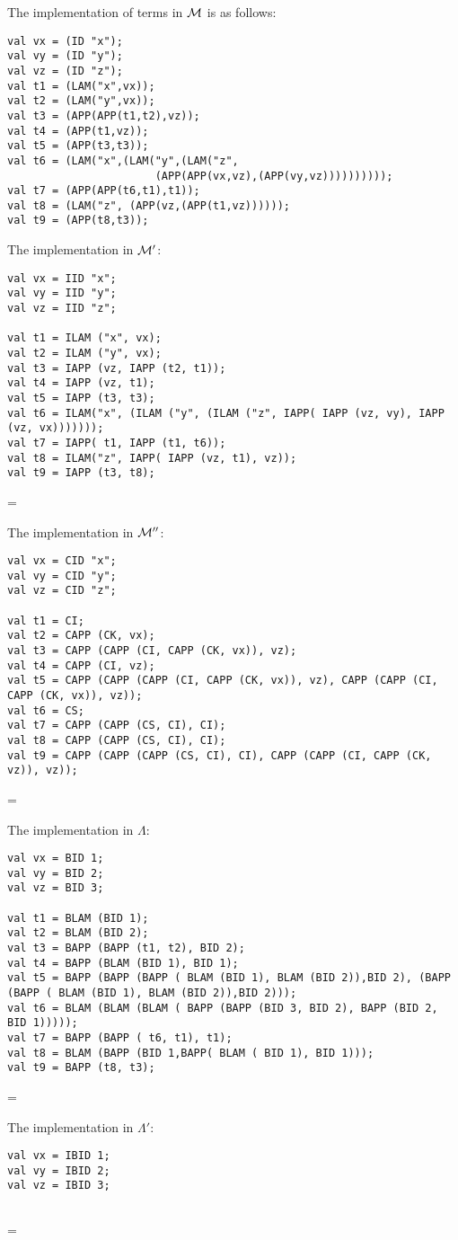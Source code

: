 \documentclass[11pt]{article}
\newenvironment{neverbreak} %
{\par\nobreak\vfil\penalty0\vfilneg
	\vtop\bgroup}
{\par\xdef\tpd{\the\prevdepth}\egroup
	\prevdepth=\tpd}
\begin{document}
\begin{enumerate}
\noindent
The implementation of terms in ${\cal M}$ is as follows:
\begin{verbatim}
val vx = (ID "x");
val vy = (ID "y");
val vz = (ID "z");
val t1 = (LAM("x",vx));
val t2 = (LAM("y",vx));
val t3 = (APP(APP(t1,t2),vz));
val t4 = (APP(t1,vz));
val t5 = (APP(t3,t3));
val t6 = (LAM("x",(LAM("y",(LAM("z",
                       (APP(APP(vx,vz),(APP(vy,vz))))))))));
val t7 = (APP(APP(t6,t1),t1));
val t8 = (LAM("z", (APP(vz,(APP(t1,vz))))));
val t9 = (APP(t8,t3));
\end{verbatim}

\vspace{1cm}
\begin{neverbreak}
The implementation in ${\cal M}'$:
\begin{verbatim}
val vx = IID "x";
val vy = IID "y";
val vz = IID "z";

val t1 = ILAM ("x", vx);
val t2 = ILAM ("y", vx);
val t3 = IAPP (vz, IAPP (t2, t1));
val t4 = IAPP (vz, t1);
val t5 = IAPP (t3, t3);
val t6 = ILAM("x", (ILAM ("y", (ILAM ("z", IAPP( IAPP (vz, vy), IAPP (vz, vx)))))));
val t7 = IAPP( t1, IAPP (t1, t6));
val t8 = ILAM("z", IAPP( IAPP (vz, t1), vz));
val t9 = IAPP (t3, t8);
\end{verbatim}
\end{neverbreak}
\vspace{1cm}
\begin{neverbreak}
The implementation in ${\cal M}''$:
\begin{verbatim}
val vx = CID "x";
val vy = CID "y";
val vz = CID "z";

val t1 = CI;
val t2 = CAPP (CK, vx);
val t3 = CAPP (CAPP (CI, CAPP (CK, vx)), vz);
val t4 = CAPP (CI, vz);
val t5 = CAPP (CAPP (CAPP (CI, CAPP (CK, vx)), vz), CAPP (CAPP (CI, CAPP (CK, vx)), vz));
val t6 = CS;
val t7 = CAPP (CAPP (CS, CI), CI);
val t8 = CAPP (CAPP (CS, CI), CI);
val t9 = CAPP (CAPP (CAPP (CS, CI), CI), CAPP (CAPP (CI, CAPP (CK, vz)), vz));
\end{verbatim}
\end{neverbreak}
\vspace{1cm}
\begin{neverbreak}
The implementation in $\Lambda$:
\begin{verbatim}
val vx = BID 1;
val vy = BID 2;
val vz = BID 3;

val t1 = BLAM (BID 1);
val t2 = BLAM (BID 2);
val t3 = BAPP (BAPP (t1, t2), BID 2);
val t4 = BAPP (BLAM (BID 1), BID 1);
val t5 = BAPP (BAPP (BAPP ( BLAM (BID 1), BLAM (BID 2)),BID 2), (BAPP (BAPP ( BLAM (BID 1), BLAM (BID 2)),BID 2)));
val t6 = BLAM (BLAM (BLAM ( BAPP (BAPP (BID 3, BID 2), BAPP (BID 2, BID 1)))));
val t7 = BAPP (BAPP ( t6, t1), t1);
val t8 = BLAM (BAPP (BID 1,BAPP( BLAM ( BID 1), BID 1)));
val t9 = BAPP (t8, t3);
\end{verbatim}
\end{neverbreak}
\vspace{1cm}
\begin{neverbreak}
The implementation in $\Lambda'$:
\begin{verbatim}
val vx = IBID 1;
val vy = IBID 2;
val vz = IBID 3;


\end{verbatim}
\end{neverbreak}
\end{enumerate}
\end{document}
